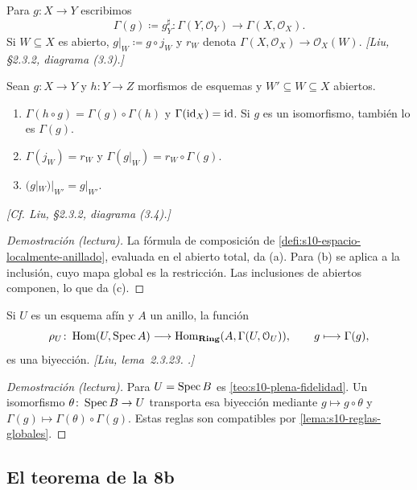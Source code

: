 \begin{defi}
\label{defi:s10-componente-global}
Para \(g\colon X\to Y\) escribimos
\[
 \Gamma(g)\coloneqq g_Y^\sharp\colon\Gamma(Y,\mathcal O_Y)\longrightarrow\Gamma(X,\mathcal O_X).
\]
Si \(W\subseteq X\) es abierto, \(g|_W\coloneqq g\circ j_W\) y \(r_W\) denota \(\Gamma(X,\mathcal O_X)\to\mathcal O_X(W)\). \emph{[Liu, \S2.3.2, diagrama (3.3).]}
\end{defi}

\begin{lema}
\label{lema:s10-reglas-globales}
Sean \(g\colon X\to Y\) y \(h\colon Y\to Z\) morfismos de esquemas y \(W'\subseteq W\subseteq X\) abiertos.
\begin{enumerate}[label=(\alph*)]
\item \(\Gamma(h\circ g)=\Gamma(g)\circ\Gamma(h)\) y \(\Gamma(\operatorname{id}_X)=\operatorname{id}\). Si \(g\) es un isomorfismo, también lo es \(\Gamma(g)\).
\item \(\Gamma(j_W)=r_W\) y \(\Gamma(g|_W)=r_W\circ\Gamma(g)\).
\item \((g|_W)|_{W'}=g|_{W'}\).
\end{enumerate}
\emph{[Cf. Liu, \S2.3.2, diagrama (3.4).]}
\end{lema}
\begin{proof}[Demostración (lectura)]
La fórmula de composición de \cref{defi:s10-espacio-localmente-anillado}, evaluada en el abierto total, da (a). Para (b) se aplica a la inclusión, cuyo mapa global es la restricción. Las inclusiones de abiertos componen, lo que da (c).
\end{proof}

\begin{lema}
\label{lema:s10-caso-afin}
Si \(U\) es un esquema afín y \(A\) un anillo, la función
\[
 \rho_U\colon\operatorname{Hom}(U,\operatorname{Spec} A)\longrightarrow
 \operatorname{Hom}_{\mathbf{Ring}}(A,\Gamma(U,\mathcal O_U)),\qquad
 g\longmapsto\Gamma(g),
\]
es una biyección. \emph{[Liu, lema~2.3.23. .]}
\end{lema}
\begin{proof}[Demostración (lectura)]
Para \(U=\operatorname{Spec} B\) es \cref{teo:s10-plena-fidelidad}. Un isomorfismo \(\theta\colon\operatorname{Spec} B\to U\) transporta esa biyección mediante \(g\mapsto g\circ\theta\) y \(\Gamma(g)\mapsto\Gamma(\theta)\circ\Gamma(g)\). Estas reglas son compatibles por \cref{lema:s10-reglas-globales}.
\end{proof}

\subsection{El teorema de la 8b}

